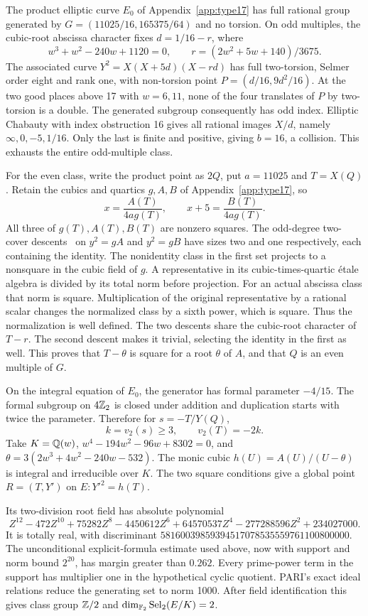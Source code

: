 The product elliptic curve $E_0$ of Appendix~\ref{app:type17} has
full rational group generated by $G=(11025/16,165375/64)$ and no
torsion. On odd multiples, the cubic-root abscissa character fixes
$d=1/16-r$, where
\[
 w^3+w^2-240w+1120=0,\qquad
 r=(2w^2+5w+140)/3675.
\]
The associated curve $Y^2=X(X+5d)(X-rd)$ has full two-torsion,
Selmer order eight and rank one, with non-torsion point
$P=(d/16,9d^2/16)$. At the two good places above 17 with
$w=6,11$, none of the four translates of $P$ by two-torsion is a
double. The generated subgroup consequently has odd index.
Elliptic Chabauty with index obstruction 16 gives all rational
images $X/d$, namely $\infty,0,-5,1/16$. Only the last is finite
and positive, giving $b=16$, a collision. This exhausts the entire
odd-multiple class.

For the even class, write the product point as $2Q$, put $a=11025$
and $T=X(Q)$. Retain the cubics and quartics $g,A,B$ of
Appendix~\ref{app:type17}, so
\[
 x=\frac{A(T)}{4ag(T)},\qquad x+5=\frac{B(T)}{4ag(T)}.
\]
All three of $g(T),A(T),B(T)$ are nonzero squares. The odd-degree two-cover descents~\cite{BruinStoll} on $y^2=gA$ and $y^2=gB$ have sizes two
and one respectively, each containing the identity. The nonidentity
class in the first set projects to a nonsquare in the cubic field
of $g$. A representative in its cubic-times-quartic étale algebra
is divided by its total norm before projection. For an actual
abscissa class that norm is square. Multiplication of the original
representative by a rational scalar changes the normalized class
by a sixth power, which is square. Thus the normalization is
well defined. The two descents share the cubic-root character
of $T-r$. The second descent makes it trivial, selecting the
identity in the first as well. This proves that $T-\theta$ is
square for a root $\theta$ of $A$, and that $Q$ is an even
multiple of $G$.

On the integral equation of $E_0$, the generator has formal
parameter $-4/15$. The formal subgroup on $4\mathbb Z_2$ is
closed under addition and duplication starts with twice the
parameter. Therefore for $s=-T/Y(Q)$,
\[
 k=v_2(s)\geq3,\qquad v_2(T)=-2k.
\]
Take $K=\mathbb Q(w)$, $w^4-194w^2-96w+8302=0$, and
$\theta=3(2w^3+4w^2-240w-532)$. The monic cubic
$h(U)=A(U)/(U-\theta)$ is integral and irreducible over $K$.
The two square conditions give a global point $R=(T,Y')$ on
$E:Y'^2=h(T)$.

Its two-division root field has absolute polynomial
\[
 Z^{12}-472Z^{10}+75282Z^8-4450612Z^6+
                  64570537Z^4-277288596Z^2+234027000.
\]
It is totally real, with discriminant
$58160039859394517078535559761100800000$. The unconditional
explicit-formula estimate used above, now with support and
norm bound $2^{20}$, has margin greater than $0.262$.
Every prime-power term in the support has multiplier one in the
hypothetical cyclic quotient. PARI's exact ideal relations reduce
the generating set to norm 1000. After field identification this
gives class group $\mathbb Z/2$ and
$\dim_{\mathbb F_2}\operatorname{Sel}_2(E/K)=2$.

